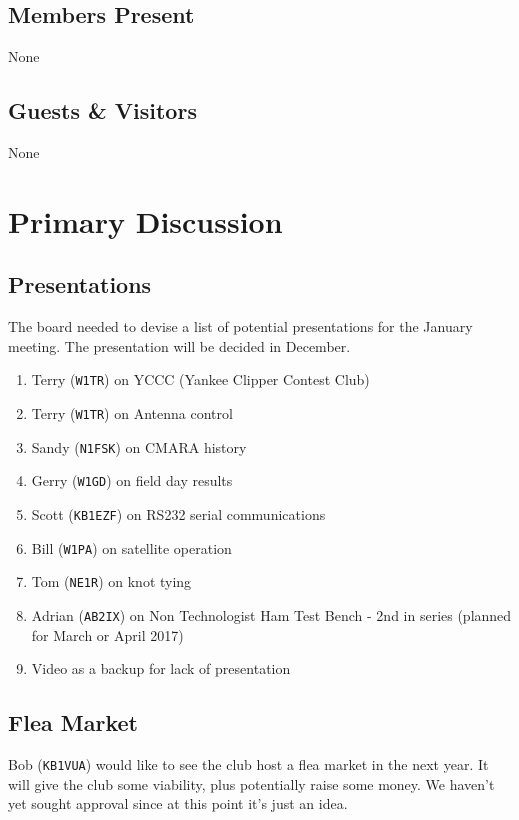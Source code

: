 \documentclass[10pt,letterpaper]{article}
\begin{document}
\subsection{Members Present}

None

\subsection{Guests \& Visitors}

None

\section{Primary Discussion}

\subsection{Presentations}

The board needed to devise a list of potential presentations for the January meeting. The presentation will be decided in December.

\begin{enumerate}
  \item Terry (\texttt{W1TR}) on YCCC (Yankee Clipper Contest Club)
  \item Terry (\texttt{W1TR}) on Antenna control
  \item Sandy (\texttt{N1FSK}) on CMARA history
  \item Gerry (\texttt{W1GD}) on field day results
  \item Scott (\texttt{KB1EZF}) on RS232 serial communications
  \item Bill (\texttt{W1PA}) on satellite operation
  \item Tom (\texttt{NE1R}) on knot tying
  \item Adrian (\texttt{AB2IX}) on Non Technologist Ham Test Bench - 2nd in series (planned for March or April 2017)
  \item Video as a backup for lack of presentation
\end{enumerate}

\subsection{Flea Market}
Bob (\texttt{KB1VUA}) would like to see the club host a flea market in the next year. It will give the club some viability, plus potentially raise some money. We haven't yet sought approval since at this point it's just an idea.
\end{document}
